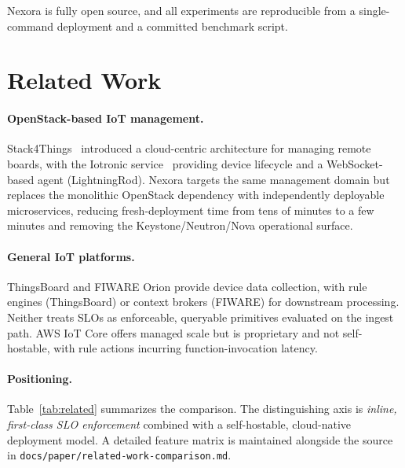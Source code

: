 \documentclass[review,12pt]{elsarticle}
\begin{document}
Nexora is fully open source, and all experiments are reproducible from a
single-command deployment and a committed benchmark script.

\section{Related Work}
\label{sec:related}

\paragraph{OpenStack-based IoT management.} Stack4Things~\cite{stack4things}
introduced a cloud-centric architecture for managing remote boards, with the
Iotronic service~\cite{iotronic} providing device lifecycle and a
WebSocket-based agent (LightningRod). Nexora targets the same management domain
but replaces the monolithic OpenStack dependency with independently deployable
microservices, reducing fresh-deployment time from tens of minutes to a few
minutes and removing the Keystone/Neutron/Nova operational surface.

\paragraph{General IoT platforms.} ThingsBoard and FIWARE Orion provide device
data collection, with rule engines (ThingsBoard) or context brokers (FIWARE)
for downstream processing. Neither treats SLOs as enforceable, queryable
primitives evaluated on the ingest path. AWS IoT Core offers managed scale but
is proprietary and not self-hostable, with rule actions incurring
function-invocation latency.

\paragraph{Positioning.} Table~\ref{tab:related} summarizes the comparison.
The distinguishing axis is \emph{inline, first-class SLO enforcement} combined
with a self-hostable, cloud-native deployment model. A detailed feature matrix
is maintained alongside the source in
\texttt{docs/paper/related-work-comparison.md}.
\end{document}
